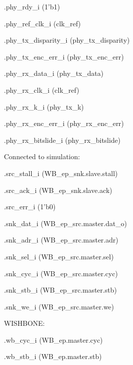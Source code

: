 \begin{dig}
\begin{dig}
\begin{dig}
\begin{dig}
            \item .phy\_rdy\_i                  (1'b1)
            \item .phy\_ref\_clk\_i              (clk\_ref)
            \item .phy\_tx\_disparity\_i         (phy\_tx\_disparity)
            \item .phy\_tx\_enc\_err\_i           (phy\_tx\_enc\_err)
            \item .phy\_rx\_data\_i              (phy\_tx\_data)
            \item .phy\_rx\_clk\_i               (clk\_ref)
            \item .phy\_rx\_k\_i                 (phy\_tx\_k)
            \item .phy\_rx\_enc\_err\_i           (phy\_rx\_enc\_err)
            \item .phy\_rx\_bitslide\_i          (phy\_rx\_bitslide)
            \end{dig}
        \item Connected to simulation:
            \begin{dig}
            \item .src\_stall\_i                (WB\_ep\_snk.slave.stall)
            \item .src\_ack\_i                  (WB\_ep\_snk.slave.ack)
            \item .src\_err\_i                  (1'b0)
            \item 
            \item .snk\_dat\_i                  (WB\_ep\_src.master.dat\_o)
            \item .snk\_adr\_i                  (WB\_ep\_src.master.adr)
            \item .snk\_sel\_i                  (WB\_ep\_src.master.sel)
            \item .snk\_cyc\_i                  (WB\_ep\_src.master.cyc)
            \item .snk\_stb\_i                  (WB\_ep\_src.master.stb)
            \item .snk\_we\_i                   (WB\_ep\_src.master.we)
            \end{dig}
        \item WISHBONE:
            \begin{dig}
            \item .wb\_cyc\_i                   (WB\_ep.master.cyc)
            \item .wb\_stb\_i                   (WB\_ep.master.stb)

\end{dig}
\end{dig}
\end{dig}
\end{dig}
